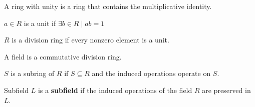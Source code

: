 \documentclass[11pt]{article}
\begin{document}
\begin{definition}
    A ring with unity is a ring that contains the multiplicative identity.
\end{definition}

\begin{definition}[Unit]
    $a \in R$ is a unit if $\exists b \in R \mid ab = 1$
\end{definition}

\begin{definition}
    $R$ is a division ring if every nonzero element is a unit.
\end{definition}

\begin{definition}[Field]
    A field is a commutative division ring.
\end{definition}

\begin{definition}[Subring]
    $S$ is a subring of $R$ if $S \subseteq R$ and the induced operations operate on $S$.
\end{definition}

\begin{definition}{Subfield}
    $L$ is a \textbf{subfield} if the induced operations of the field $R$ are preserved in $L$.
\end{definition}
\end{document}
